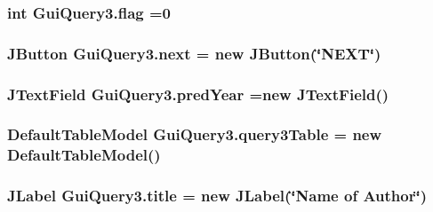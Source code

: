 \subsubsection[{\texorpdfstring{flag}{flag}}]{\setlength{\rightskip}{0pt plus 5cm}int Gui\+Query3.\+flag =0\hspace{0.3cm}{\ttfamily [private]}}\hypertarget{classGuiQuery3_acf9c75dae1db9c0c40a25d88137cb372}{}\label{classGuiQuery3_acf9c75dae1db9c0c40a25d88137cb372}
\subsubsection[{\texorpdfstring{next}{next}}]{\setlength{\rightskip}{0pt plus 5cm}J\+Button Gui\+Query3.\+next = new J\+Button(\char`\"{}N\+E\+XT\char`\"{})\hspace{0.3cm}{\ttfamily [private]}}\hypertarget{classGuiQuery3_a4d7e8b050499e731a78c43d9c41782e6}{}\label{classGuiQuery3_a4d7e8b050499e731a78c43d9c41782e6}
\subsubsection[{\texorpdfstring{pred\+Year}{predYear}}]{\setlength{\rightskip}{0pt plus 5cm}J\+Text\+Field Gui\+Query3.\+pred\+Year =new J\+Text\+Field()\hspace{0.3cm}{\ttfamily [private]}}\hypertarget{classGuiQuery3_afedb6af40be4ff198922c85bbe94716f}{}\label{classGuiQuery3_afedb6af40be4ff198922c85bbe94716f}
\subsubsection[{\texorpdfstring{query3\+Table}{query3Table}}]{\setlength{\rightskip}{0pt plus 5cm}Default\+Table\+Model Gui\+Query3.\+query3\+Table = new Default\+Table\+Model()\hspace{0.3cm}{\ttfamily [private]}}\hypertarget{classGuiQuery3_a8273c6d7086d34e6f91fc9721af410d9}{}\label{classGuiQuery3_a8273c6d7086d34e6f91fc9721af410d9}
\subsubsection[{\texorpdfstring{title}{title}}]{\setlength{\rightskip}{0pt plus 5cm}J\+Label Gui\+Query3.\+title = new J\+Label(\char`\"{}Name of {\bf Author}\char`\"{})\hspace{0.3cm}{\ttfamily [private]}}\hypertarget{classGuiQuery3_a7e581a0af7c5a7aafe78127499af4ea6}{}\label{classGuiQuery3_a7e581a0af7c5a7aafe78127499af4ea6}
